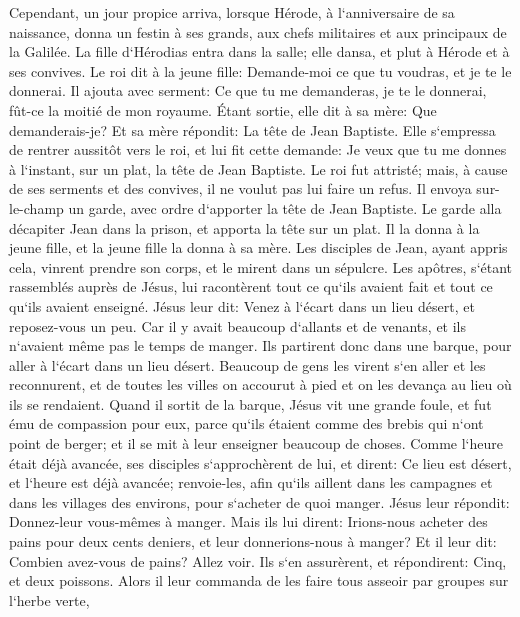 \verse Cependant, un jour propice arriva, lorsque Hérode, à l`anniversaire de sa naissance, donna un festin à ses grands, aux chefs militaires et aux principaux de la Galilée. 
\verse La fille d`Hérodias entra dans la salle; elle dansa, et plut à Hérode et à ses convives. Le roi dit à la jeune fille: Demande-moi ce que tu voudras, et je te le donnerai. 
\verse Il ajouta avec serment: Ce que tu me demanderas, je te le donnerai, fût-ce la moitié de mon royaume. 
\verse Étant sortie, elle dit à sa mère: Que demanderais-je? Et sa mère répondit: La tête de Jean Baptiste. 
\verse Elle s`empressa de rentrer aussitôt vers le roi, et lui fit cette demande: Je veux que tu me donnes à l`instant, sur un plat, la tête de Jean Baptiste. 
\verse Le roi fut attristé; mais, à cause de ses serments et des convives, il ne voulut pas lui faire un refus. 
\verse Il envoya sur-le-champ un garde, avec ordre d`apporter la tête de Jean Baptiste. 
\verse Le garde alla décapiter Jean dans la prison, et apporta la tête sur un plat. Il la donna à la jeune fille, et la jeune fille la donna à sa mère. 
\verse Les disciples de Jean, ayant appris cela, vinrent prendre son corps, et le mirent dans un sépulcre. 
\verse Les apôtres, s`étant rassemblés auprès de Jésus, lui racontèrent tout ce qu`ils avaient fait et tout ce qu`ils avaient enseigné. 
\verse Jésus leur dit: Venez à l`écart dans un lieu désert, et reposez-vous un peu. Car il y avait beaucoup d`allants et de venants, et ils n`avaient même pas le temps de manger. 
\verse Ils partirent donc dans une barque, pour aller à l`écart dans un lieu désert. 
\verse Beaucoup de gens les virent s`en aller et les reconnurent, et de toutes les villes on accourut à pied et on les devança au lieu où ils se rendaient. 
\verse Quand il sortit de la barque, Jésus vit une grande foule, et fut ému de compassion pour eux, parce qu`ils étaient comme des brebis qui n`ont point de berger; et il se mit à leur enseigner beaucoup de choses. 
\verse Comme l`heure était déjà avancée, ses disciples s`approchèrent de lui, et dirent: Ce lieu est désert, et l`heure est déjà avancée; 
\verse renvoie-les, afin qu`ils aillent dans les campagnes et dans les villages des environs, pour s`acheter de quoi manger. 
\verse Jésus leur répondit: Donnez-leur vous-mêmes à manger. Mais ils lui dirent: Irions-nous acheter des pains pour deux cents deniers, et leur donnerions-nous à manger? 
\verse Et il leur dit: Combien avez-vous de pains? Allez voir. Ils s`en assurèrent, et répondirent: Cinq, et deux poissons. 
\verse Alors il leur commanda de les faire tous asseoir par groupes sur l`herbe verte, 

